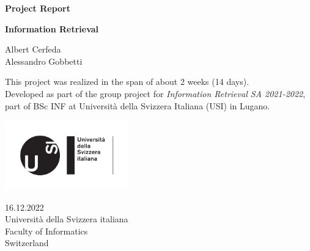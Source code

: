 \documentclass[tikz,14pt]{article}
\newcommand\assignmenttitle{Project Report}
\newcommand\namesurname{Albert Cerfeda\\Alessandro Gobbetti}
\newcommand\assignment{}
\newcommand\subject{Information Retrieval}
\newcommand\documentdate{16.12.2022}
\begin{document}
\begin{titlepage}
   \begin{center}
       \vspace*{1cm}

       \textbf{\Large{\assignmenttitle}}

       \vspace{0.5cm}
        \textbf{\subject}\\[5mm]
       \assignment
        
            
       \vspace{1.1cm}

        \namesurname\\
        \vspace{1cm}

        This project was realized in the span of about 2 weeks (14 days).\\
Developed as part of the group project for \textit{Information Retrieval SA 2021-2022}, part of BSc INF at Università della Svizzera Italiana (USI) in Lugano.
       \tableofcontents
       

       \vspace*{\fill}
     
       \includegraphics[width=0.4\textwidth]{fig/logo.pdf}
       
        \documentdate \\
        Università della Svizzera italiana\\
        Faculty of Informatics\\
        Switzerland\\

   \end{center}
\end{titlepage}





\end{document}
